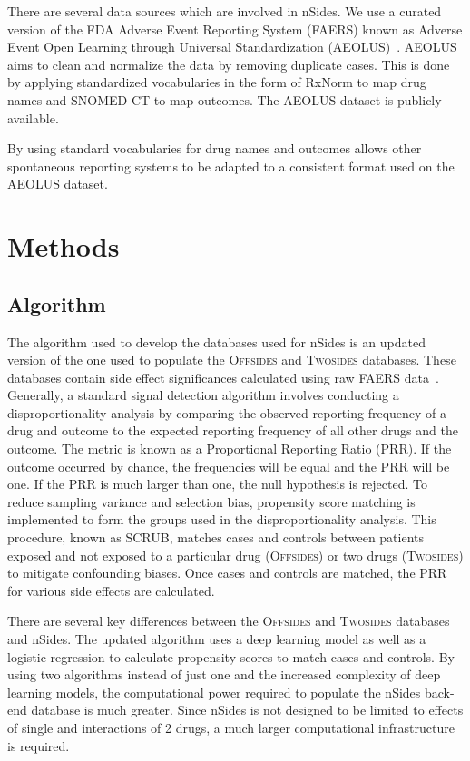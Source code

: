 \documentclass{ws-procs11x85}
\begin{document}
There are several data sources which are involved in nSides. We use a
curated version of the FDA Adverse Event Reporting System (FAERS)
known as Adverse Event Open Learning through Universal Standardization
(AEOLUS)~\cite{AEOLUS}.  AEOLUS aims to clean and normalize the data
by removing duplicate cases. This is done by applying standardized
vocabularies in the form of RxNorm to map drug names and SNOMED-CT to
map outcomes. The AEOLUS dataset is publicly available.

By using standard vocabularies for drug names and outcomes allows
other spontaneous reporting systems to be adapted to a consistent
format used on the AEOLUS dataset.

\section{Methods}

\subsection{Algorithm}
The algorithm used to develop the databases used for nSides is an
updated version of the one used to populate the O\textsc{ffsides} and
T\textsc{wosides} databases.  These databases contain side effect
significances calculated using raw FAERS data~\cite{Tatonetti2012}.
Generally, a standard signal detection algorithm involves conducting a
disproportionality analysis by comparing the observed reporting
frequency of a drug and outcome to the expected reporting frequency of
all other drugs and the outcome. The metric is known as a Proportional
Reporting Ratio (PRR). If the outcome occurred by chance, the
frequencies will be equal and the PRR will be one. If the PRR is much
larger than one, the null hypothesis is rejected. To reduce sampling
variance and selection bias, propensity score matching is implemented
to form the groups used in the disproportionality analysis. This
procedure, known as SCRUB, matches cases and controls between patients
exposed and not exposed to a particular drug (O\textsc{ffsides}) or
two drugs (T\textsc{wosides}) to mitigate confounding biases. Once
cases and controls are matched, the PRR for various side effects are
calculated.

There are several key differences between the O\textsc{ffsides} and
T\textsc{wosides} databases and nSides. The updated algorithm uses a
deep learning model as well as a logistic regression to calculate
propensity scores to match cases and controls. By using two algorithms
instead of just one and the increased complexity of deep learning
models, the computational power required to populate the nSides
back-end database is much greater. Since nSides is not designed to be
limited to effects of single and interactions of 2 drugs, a much
larger computational infrastructure is required.
\end{document}
